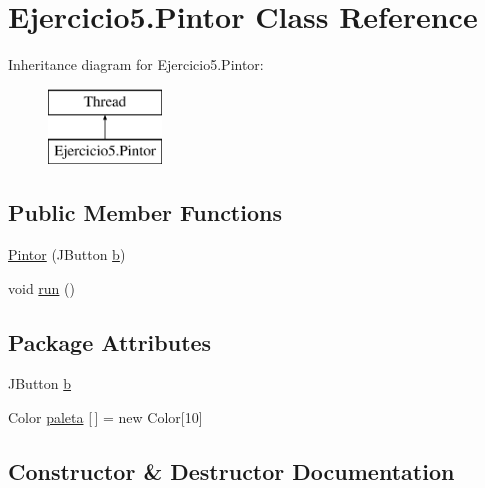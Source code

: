 \hypertarget{class_ejercicio5_1_1_pintor}{}\section{Ejercicio5.\+Pintor Class Reference}
\label{class_ejercicio5_1_1_pintor}
Inheritance diagram for Ejercicio5.\+Pintor\+:\begin{figure}[H]
\begin{center}
\leavevmode
\includegraphics[height=2.000000cm]{class_ejercicio5_1_1_pintor}
\end{center}
\end{figure}
\subsection*{Public Member Functions}
\begin{DoxyCompactItemize}
\item 
\mbox{\hyperlink{class_ejercicio5_1_1_pintor_a066c5c189c40341786e8728f32258190}{Pintor}} (J\+Button \mbox{\hyperlink{class_ejercicio5_1_1_pintor_a470004bc84afaefaee715182d6601df2}{b}})
\item 
void \mbox{\hyperlink{class_ejercicio5_1_1_pintor_a31cafae186af58bb92c56a642d0997cb}{run}} ()
\end{DoxyCompactItemize}
\subsection*{Package Attributes}
\begin{DoxyCompactItemize}
\item 
J\+Button \mbox{\hyperlink{class_ejercicio5_1_1_pintor_a470004bc84afaefaee715182d6601df2}{b}}
\item 
Color \mbox{\hyperlink{class_ejercicio5_1_1_pintor_a8604057520bcd80da76eb95ac70367a9}{paleta}} \mbox{[}$\,$\mbox{]} = new Color\mbox{[}10\mbox{]}
\end{DoxyCompactItemize}


\subsection{Constructor \& Destructor Documentation}
\mbox{\label{class_ejercicio5_1_1_pintor_a066c5c189c40341786e8728f32258190}} 
